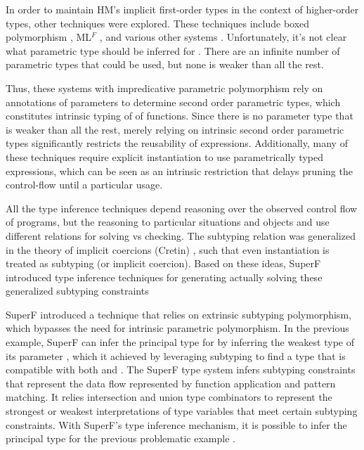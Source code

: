 \documentclass[table,dvipsnames,acmsmall]{acmart}
\theoremstyle{definition}
\begin{document}
In order to maintain HM's implicit first-order types in the context
of higher-order types, other techniques were explored.  
These techniques include boxed polymorphism \cite{}, ML$^F$ \cite{}, and various other systems \cite{}. 
Unfortunately, it's not clear what parametric type should be inferred for .
There are an infinite number of
parametric types that could be used, but none is weaker than all the rest.


Thus, these systems with impredicative parametric polymorphism rely on annotations of parameters to
determine second order parametric types, which constitutes intrinsic typing of
of functions. 
Since there is no parameter type that is weaker than all the rest,
merely relying on intrinsic second order parametric types 
significantly restricts the reusability of expressions.
Additionally, many of these techniques require explicit instantiation to use parametrically typed
expressions, which can be seen as an intrinsic restriction that 
delays pruning the control-flow until a particular usage. 





All the type inference techniques depend reasoning over the observed control flow  
of programs, but the reasoning to particular situations and objects and use different
relations for solving vs checking.  The subtyping relation was generalized in the theory of implicit coercions (Cretin) \cite{},
such that even instantiation is treated as subtyping (or implicit coercion).  
Based on these ideas, SuperF \cite{} introduced type inference techniques for generating actually solving
these generalized subtyping constraints

SuperF \cite{} introduced 
a technique that relies on extrinsic subtyping polymorphism, 
which bypasses the need for intrinsic parametric polymorphism.
In the previous example, SuperF can infer the principal type for  by inferring the 
weakest type of its parameter , which it achieved by leveraging subtyping to find 
a type that is compatible with both  and .
The SuperF type system infers subtyping constraints that represent the data flow represented by
function application and pattern matching. It relies 
intersection and union type combinators to represent the strongest or weakest interpretations
of type variables that meet certain subtyping constraints.   
With SuperF's type inference mechanism, it is possible to infer the principal type for the 
previous problematic example .
\end{document}
